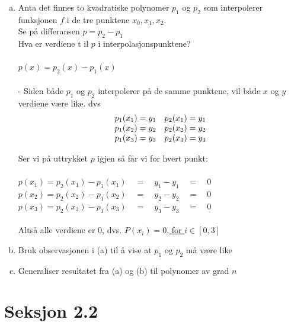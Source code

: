 \documentclass{article}
\newcommand{\uu}[1]{\underline{\underline{#1}}}
\newcommand{\eqq}{\quad=\quad}
\begin{document}
 \begin{enumerate}[a)]
 
     \item Anta det finnes to kvadratiske polynomer $p_1$ og $p_2$ som interpolerer funksjonen $f$ i de tre punktene $x_0, x_1, x_2$. \\
     Se på differansen $p=p_2-p_1$ \\
     Hva er verdiene t il $p$ i interpolasjonspunktene?
         \\\\
    \(p(x) = p_2(x) - p_1(x)\)
    \\\\
    - Siden både $p_1$ og $p_2$ interpolerer på de samme punktene, vil både $x$ og $y$ verdiene være like. dvs\\
    \[
    \begin{array}{c  c}
    p_1(x_1) = y_1 & p_2(x_1) = y_1 \\
    p_1(x_2) = y_2 & p_2(x_2) = y_2 \\
    p_1(x_3) = y_3 & p_2(x_3) = y_3 \\
    \end{array}
    \]

    Ser vi på uttrykket $p$ igjen så får vi for hvert punkt:\\\\
    $p(x_1) = p_2(x_1) - p_1(x_1) \eqq y_1 - y_1 \eqq 0$ \\
    $p(x_2) = p_2(x_2) - p_1(x_2) \eqq y_2 - y_2 \eqq 0$ \\
    $p(x_3) = p_2(x_3) - p_1(x_3) \eqq y_3 - y_3 \eqq 0$ \\\\

    Altså alle verdiene er 0, dvs. \uu{$P(x_i)=0$, for $i \in [0,3]$}


     \vspace{2em}

     \item Bruk observasjonen i (a) til å vise at $p_1$ og $p_2$ må være like

     \vspace{2em}

     \item Generaliser resultatet fra (a) og (b) til polynomer av grad $n$
     
 \end{enumerate}


\newpage
\section*{Seksjon 2.2}
\end{document}
